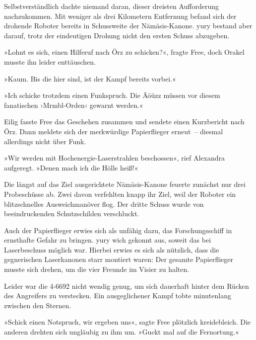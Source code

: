 

Selbstverständlich dachte niemand daran, dieser dreisten Aufforderung nachzukommen. Mit weniger als drei Kilometern Entfernung befand sich der drohende Roboter bereits in Schussweite der Nämäsis-Kanone. yury bestand aber darauf, trotz der eindeutigen Drohung nicht den ersten Schuss abzugeben.

»Lohnt es sich, einen Hilferuf nach Örz zu schicken?«, fragte Free, doch Orakel musste ihn leider enttäuschen.

»Kaum. Bis die hier sind, ist der Kampf bereits vorbei.«

»Ich schicke trotzdem einen Funkspruch. Die Äöüzz müssen vor diesem fanatischen ›Mrmbl-Orden‹ gewarnt werden.«

Eilig fasste Free das Geschehen zusammen und sendete einen Kurzbericht nach Örz. Dann meldete sich der merkwürdige Papierflieger erneut~– diesmal allerdings nicht über Funk.

»Wir werden mit Hochenergie-Laserstrahlen beschossen«, rief Alexandra aufgeregt. »Denen mach ich die Hölle heiß!«

Die längst auf das Ziel ausgerichtete Nämäsis-Kanone feuerte zunächst nur drei Probeschüsse ab. Zwei davon verfehlten knapp ihr Ziel, weil der Roboter ein blitzschnelles Ausweichmanöver flog. Der dritte Schuss wurde von beeindruckenden Schutzschilden verschluckt.

Auch der Papierflieger erwies sich als unfähig dazu, das Forschungsschiff in ernsthafte Gefahr zu bringen. yury wich gekonnt aus, soweit das bei Laserbeschuss möglich war. Hierbei erwies es sich als nützlich, dass die gegnerischen Laserkanonen starr montiert waren: Der gesamte Papierflieger musste sich drehen, um die vier Freunde im Visier zu halten.

Leider war die 4-6692 nicht wendig genug, um sich dauerhaft hinter dem Rücken des Angreifers zu verstecken. Ein ausgeglichener Kampf tobte minutenlang zwischen den Sternen.

»Schick einen Notspruch, wir ergeben uns«, sagte Free plötzlich kreidebleich. Die anderen drehten sich ungläubig zu ihm um. »Guckt mal auf die Fernortung.«

